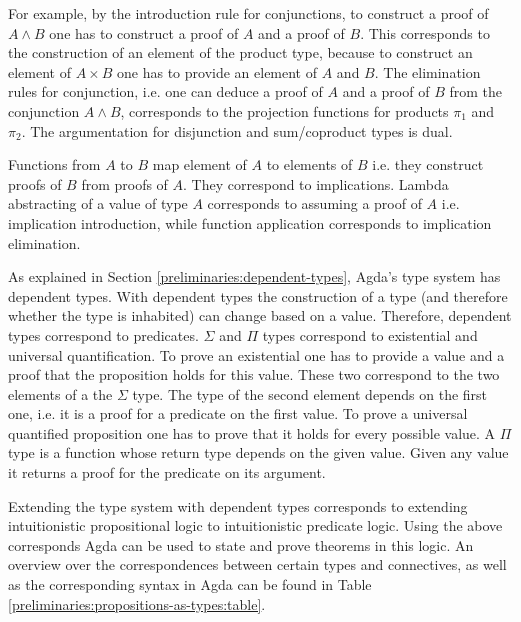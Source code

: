 For example, by the introduction rule for conjunctions, to construct a proof of
$A\wedge B$ one has to construct a proof of $A$ and a proof of $B$.
This corresponds to the construction of an element of the product type, because
to construct an element of $A\times B$ one has to provide an element of $A$ and
$B$.
The elimination rules for conjunction, i.e. one can deduce a proof of $A$ and a
proof of $B$ from the conjunction $A \wedge B$, corresponds to the projection
functions for products $\pi_1$ and $\pi_2$.
The argumentation for disjunction and sum/coproduct types is dual.

Functions from $A$ to $B$ map element of $A$ to elements of $B$ i.e. they
construct proofs of $B$ from proofs of $A$.
They correspond to implications.
Lambda abstracting of a value of type $A$ corresponds to assuming a proof of $A$
i.e. implication introduction, while function application corresponds to
implication elimination.

As explained in Section \ref{preliminaries:dependent-types}, Agda's type system
has dependent types.
With dependent types the construction of a type (and therefore whether the type
is inhabited) can change based on a value.
Therefore, dependent types correspond to predicates.
$\Sigma$ and $\Pi$ types correspond to existential and universal quantification.
To prove an existential one has to provide a value and a proof that the
proposition holds for this value.
These two correspond to the two elements of a the $\Sigma$ type.
The type of the second element depends on the first one, i.e. it is a proof for a
predicate on the first value.
To prove a universal quantified proposition one has to prove that it holds for
every possible value.
A $\Pi$ type is a function whose return type depends on the given value.
Given any value it returns a proof for the predicate on its argument.

Extending the type system with dependent types corresponds to extending
intuitionistic propositional logic to intuitionistic predicate logic.
Using the above corresponds Agda can be used to state and prove theorems in
this logic.
An overview over the correspondences between certain types and connectives, as
well as the corresponding syntax in Agda can be found in Table
\ref{preliminaries:propositions-as-types:table}.

